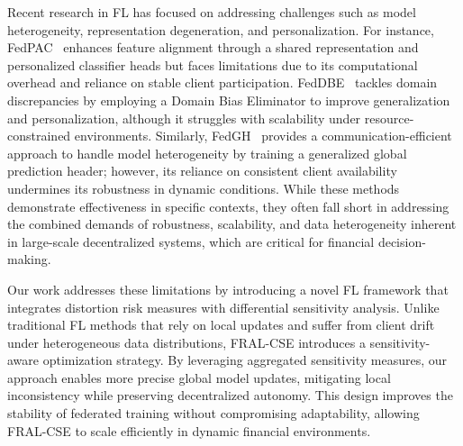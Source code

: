 Recent research in FL has focused on addressing challenges such as model heterogeneity, representation degeneration, and personalization. For instance, FedPAC~\cite{xu2023personalized} enhances feature alignment through a shared representation and personalized classifier heads but faces limitations due to its computational overhead and reliance on stable client participation. FedDBE~\cite{zhang2024eliminating} tackles domain discrepancies by employing a Domain Bias Eliminator to improve generalization and personalization, although it struggles with scalability under resource-constrained environments. Similarly, FedGH~\cite{yi2023fedgh} provides a communication-efficient approach to handle model heterogeneity by training a generalized global prediction header; however, its reliance on consistent client availability undermines its robustness in dynamic conditions. While these methods demonstrate effectiveness in specific contexts, they often fall short in addressing the combined demands of robustness, scalability, and data heterogeneity inherent in large-scale decentralized systems, which are critical for financial decision-making. 


Our work addresses these limitations by introducing a novel FL framework that integrates distortion risk measures with differential sensitivity analysis. Unlike traditional FL methods that rely on local updates and suffer from client drift under heterogeneous data distributions, FRAL-CSE introduces a sensitivity-aware optimization strategy. By leveraging aggregated sensitivity measures, our approach enables more precise global model updates, mitigating local inconsistency while preserving decentralized autonomy. This design improves the stability of federated training without compromising adaptability, allowing FRAL-CSE to scale efficiently in dynamic financial environments.